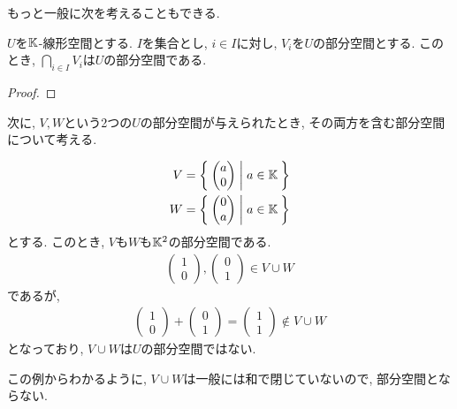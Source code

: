 もっと一般に次を考えることもできる.
\begin{example}
  $U$を$\mathbb{K}$-線形空間とする.
  $I$を集合とし,
  $i\in I$に対し, $V_i$を$U$の部分空間とする.
  このとき, $\bigcap_{i\in I}V_i$は$U$の部分空間である.
\end{example}
\begin{proof}\end{proof}


次に, $V,W$という2つの$U$の部分空間が与えられたとき,
その両方を含む部分空間について考える.

\begin{example}
  \label{subspace:nonexample:cup}
  \begin{align*}
    V&=\Set{\begin{pmatrix}a\\0\end{pmatrix}|a\in\mathbb{K}}\\
    W&=\Set{\begin{pmatrix}0\\a\end{pmatrix}|a\in\mathbb{K}}
  \end{align*}
  とする.
  このとき, $V$も$W$も$\mathbb{K}^2$の部分空間である.
  \begin{align*}
    \begin{pmatrix}1\\0\end{pmatrix},
    \begin{pmatrix}0\\1\end{pmatrix}\in V\cup W
  \end{align*}
  であるが,
  \begin{align*}
    \begin{pmatrix}1\\0\end{pmatrix}+
    \begin{pmatrix}0\\1\end{pmatrix}=\begin{pmatrix}1\\1\end{pmatrix}\not\in V\cup W
  \end{align*}
  となっており, $V\cup W$は$U$の部分空間ではない.
\end{example}
この例からわかるように, $V\cup W$は一般には和で閉じていないので,
部分空間とならない.

